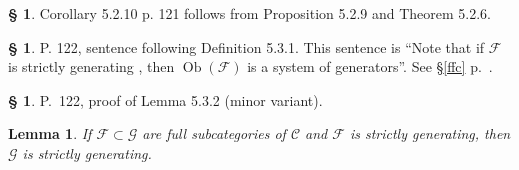 \documentclass[12pt]{article}%
\newtheorem{lem}[thm]{Lemma}
\theoremstyle{remark}
\theoremstyle{definition}
\newtheorem{s}[thm]{\S}%
\newcommand{\cc}{\mathcal}
\newcommand{\C}{\mathcal C}
\newcommand{\F}{\mathcal F}
\newcommand{\G}{\mathcal G}
\DeclareMathOperator{\Ob}{Ob}
\begin{document}
%

\begin{s}
Corollary 5.2.10 p. 121 follows from Proposition 5.2.9 and Theorem 5.2.6.
\end{s}

%

\begin{s}
P. 122, sentence following Definition 5.3.1. This sentence is ``Note that if $\cc F$ is strictly generating , then $\Ob(\cc F)$ is a system of generators''. See \S\ref{ffc} p.~\pageref{ffc}.
\end{s}

%

\begin{s} 
P.~122, proof of Lemma 5.3.2 (minor variant). 

\begin{lem} 
If $\F\subset\G$ are full subcategories of $\C$ and $\F$ is strictly generating, then $\G$ is strictly generating. 
\end{lem} 


\end{s}
\end{document}
